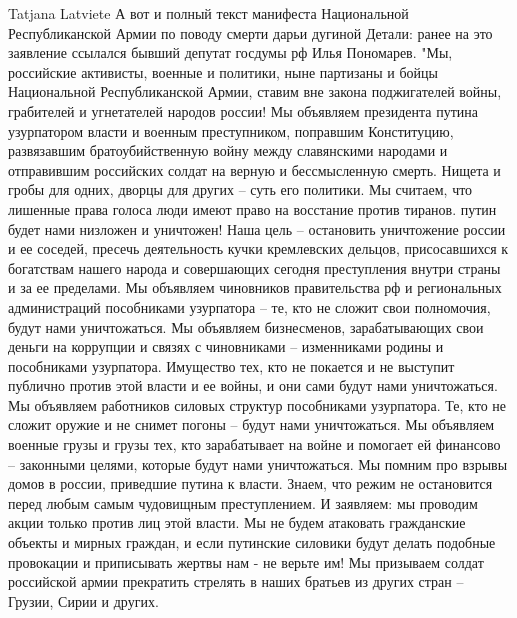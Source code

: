  
 
 
 
 

Tatjana Latviete
А вот и полный текст манифеста Национальной Республиканской Армии по поводу смерти дарьи дугиной
Детали: ранее на это заявление ссылался бывший депутат госдумы рф Илья Пономарев.
"Мы, российские активисты, военные и политики, ныне партизаны и бойцы Национальной Республиканской Армии, ставим вне закона поджигателей войны, грабителей и угнетателей народов россии!
Мы объявляем президента путина узурпатором власти и военным преступником, поправшим Конституцию, развязавшим братоубийственную войну между славянскими народами и отправившим российских солдат на верную и бессмысленную смерть.
Нищета и гробы для одних, дворцы для других – суть его политики.
Мы считаем, что лишенные права голоса люди имеют право на восстание против тиранов.
путин будет нами низложен и уничтожен!
Наша цель – остановить уничтожение россии и ее соседей, пресечь деятельность кучки кремлевских дельцов, присосавшихся к богатствам нашего народа и совершающих сегодня преступления внутри страны и за ее пределами.
Мы объявляем чиновников правительства рф и региональных администраций пособниками узурпатора – те, кто не сложит свои полномочия, будут нами уничтожаться.
Мы объявляем бизнесменов, зарабатывающих свои деньги на коррупции и связях с чиновниками – изменниками родины и пособниками узурпатора. Имущество тех, кто не покается и не выступит публично против этой власти и ее войны, и они сами будут нами уничтожаться.
Мы объявляем работников силовых структур пособниками узурпатора. Те, кто не сложит оружие и не снимет погоны – будут нами уничтожаться.
Мы объявляем военные грузы и грузы тех, кто зарабатывает на войне и помогает ей финансово – законными целями, которые будут нами уничтожаться.
Мы помним про взрывы домов в россии, приведшие путина к власти. Знаем, что режим не остановится перед любым самым чудовищным преступлением. И заявляем: мы проводим акции только против лиц этой власти. Мы не будем атаковать гражданские объекты и мирных граждан, и если путинские силовики будут делать подобные провокации и приписывать жертвы нам - не верьте им!
Мы призываем солдат российской армии прекратить стрелять в наших братьев из других стран – Грузии, Сирии и других.
